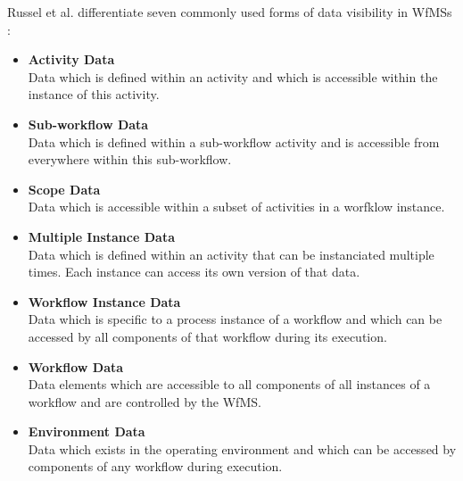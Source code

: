     Russel et al. differentiate seven commonly used forms of data visibility in \acp{WfMS} \cite[p.~6-15]{Russell2005Workflow}:
    \begin{itemize}[nosep]
      \item \textbf{Activity Data} \hfill \\
        Data which is defined within an activity and which is accessible within the instance of this activity.
      \item \textbf{Sub-workflow Data} \hfill \\
        Data which is defined within a sub-workflow activity and is accessible from everywhere within this sub-workflow.
      \item \textbf{Scope Data} \hfill \\
        Data which is accessible within a subset of activities in a worfklow instance.
      \item \textbf{Multiple Instance Data} \hfill \\
        Data which is defined within an activity that can be instanciated multiple times. Each instance can access its own version of that data.
      \item \textbf{Workflow Instance Data} \hfill \\
        Data which is specific to a process instance of a workflow and which can be accessed by all components of that workflow during its execution.
      \item \textbf{Workflow Data} \hfill \\
        Data elements which are accessible to all components of all instances of a workflow and are controlled by the \ac{WfMS}.
      \item \textbf{Environment Data} \hfill \\
        Data which exists in the operating environment and which can be accessed by components of any workflow during execution.
    \end{itemize}

